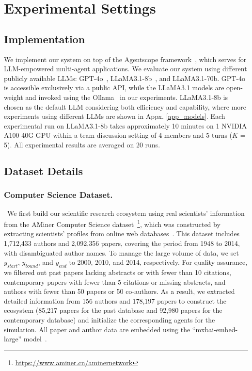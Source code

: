 \documentclass[11pt]{article}
\begin{document}
\section{Experimental Settings}
\label{appx:experimental_settings}
\subsection{Implementation}
We implement our system on top of the Agentscope framework~\citep{agentscope}, which serves for LLM-empowered multi-agent applications. We evaluate our system using different publicly available LLMs: GPT-4o~\citep{openai}, LLaMA3.1-8b~\citep{llama3}, and LLaMA3.1-70b. GPT-4o is accessible exclusively via a public API, while the LLaMA3.1 models are open-weight and invoked using the Ollama~\citep{ollama_github} in our experiments. LLaMA3.1-8b is chosen as the default LLM considering both efficiency and capability, where more experiments using different LLMs are shown in Appx. \ref{app_models}. Each experimental run on LLaMA3.1-8b takes approximately 10 minutes on 1 NVIDIA A100 40G GPU within a team discussion setting of 4 members and 5 turns ($K$ = 5). All experimental results are averaged on 20 runs.
\subsection{Dataset Details}
{\subsubsection{Computer Science Dataset.}~We first build our scientific research ecosystem using real scientists' information from the AMiner Computer Science dataset~\footnote{\url{https://www.aminer.cn/aminernetwork}}, which was constructed by extracting scientists' profiles from online web databases~\citep{tang2008arnetminer}. This dataset includes 1,712,433 authors and 2,092,356 papers, covering the period from 1948 to 2014, with disambiguated author names. To manage the large volume of data, we set $y_{start}$, $y_{bound}$, and $y_{end}$ to 2000, 2010, and 2014, respectively. 
For quality assurance, we filtered out past papers lacking abstracts or with fewer than 10 citations, contemporary papers with fewer than 5 citations or missing abstracts, and authors with fewer than 50 papers or 50 co-authors. As a result, we extracted detailed information from 156 authors and 178,197 papers to construct the ecosystem (85,217 papers for the past database and 92,980 papers for the contemporary database) and initialize the corresponding agents for the simulation. All paper and author data are embedded using the ``mxbai-embed-large'' model~\citep{emb2024mxbai}.}
\end{document}
